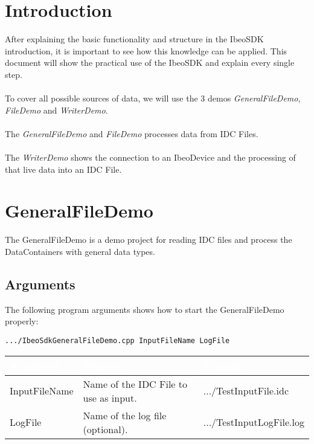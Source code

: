 \section{Introduction}
After explaining the basic functionality and structure in the IbeoSDK introduction, it is important to see how this knowledge can be applied. This document will show the practical use of the IbeoSDK and explain every single step.
\\\\
To cover all possible sources of data, we will use the 3 demos \textit{GeneralFileDemo}, \textit{FileDemo} and \textit{WriterDemo}.
\\\\
The \textit{GeneralFileDemo} and \textit{FileDemo} processes data from IDC Files.
\\\\
The \textit{WriterDemo} shows the connection to an IbeoDevice and the processing of that live data into an IDC File.
\newpage
\section{GeneralFileDemo}
The GeneralFileDemo is a demo project for reading IDC files and process the DataContainers with general data types.
\subsection{Arguments}
The following program arguments shows how to start the GeneralFileDemo properly: \\
\begin{lstlisting}[numbers=none]
.../IbeoSdkGeneralFileDemo.cpp InputFileName LogFile
\end{lstlisting}

\begin{table}[!htbp]
	\begin{center}
		\renewcommand{\arraystretch}{1.5}
		\begin{tabularx}{\textwidth}{| p{} | p{} | X |}
			\hline
			\cellcolor{ibeo_red} \textcolor{white}{\textbf{Argument}} & \cellcolor{ibeo_red} \textcolor{white}{\textbf{Purpose}} & \cellcolor{ibeo_red} \textcolor{white}{\textbf{Example}} \\
			
			\hline
			InputFileName & Name of the IDC File to use as input. & .../TestInputFile.idc
			\\
			
			\hline
			LogFile & Name of the log file (optional). & .../TestInputLogFile.log
			\\
			
			\hline
		\end{tabularx}
	\end{center}
\end{table}

